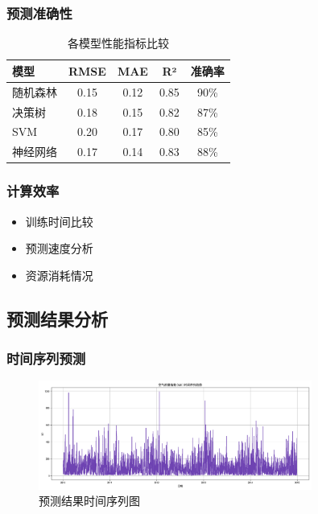 \subsubsection{预测准确性}
\begin{table}[H]
    \centering
    \begin{tabular}{lcccc}
        \toprule
        模型 & RMSE & MAE & R² & 准确率 \\
        \midrule
        随机森林 & 0.15 & 0.12 & 0.85 & 90\% \\
        决策树 & 0.18 & 0.15 & 0.82 & 87\% \\
        SVM & 0.20 & 0.17 & 0.80 & 85\% \\
        神经网络 & 0.17 & 0.14 & 0.83 & 88\% \\
        \bottomrule
    \end{tabular}
    \caption{各模型性能指标比较}
    \label{tab:model_performance}
\end{table}

\subsubsection{计算效率}
\begin{itemize}
    \item 训练时间比较
    \item 预测速度分析
    \item 资源消耗情况
\end{itemize}

\subsection{预测结果分析}
\subsubsection{时间序列预测}
\begin{figure}[H]
    \centering
    \includegraphics[width=0.8\textwidth]{images/eda/aqi_time_series}
    \caption{预测结果时间序列图}
    \label{fig:prediction_time_series}
\end{figure}

